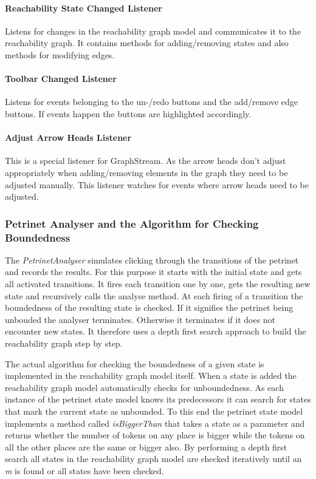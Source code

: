 \documentclass[10pt, a4paper]{article}
\begin{document}
\paragraph{Reachability State Changed Listener} Listens for changes in the reachability graph model and communicates it to the reachability graph. It contains methods for adding/removing states and also methods for modifying edges.
\paragraph{Toolbar Changed Listener} Listens for events belonging to the un-/redo buttons and the add/remove edge buttons. If events happen the buttons are highlighted accordingly.
\paragraph{Adjust Arrow Heads Listener} This is a special listener for GraphStream. As the arrow heads don't adjust appropriately when adding/removing elements in the graph they need to be adjusted manually. This listener watches for events where arrow heads need to be adjusted.

\subsubsection{Petrinet Analyser and the Algorithm for Checking Boundedness}
\label{label:algorithm}

The \textit{PetrinetAnalyser} simulates clicking through the transitions of the petrinet and records the results. For this purpose it starts with the initial state and gets all activated transitions. It fires each transition one by one, gets the resulting new state and recursively calls the analyse method. At each firing of a transition the boundedness of the resulting state is checked. If it signifies the petrinet being unbouded the analyser terminates. Otherwise it terminates if it does not encounter new states. It therefore uses a depth first search approach to build the reachability graph step by step.

The actual algorithm for checking the boundedness of a given state is implemented in the reachability graph model itself. When a state is added the reachability graph model automatically checks for unboundedness. As each instance of the petrinet state model knows its predecessors it can search for states that mark the current state as unbounded. To this end the petrinet state model implements a method called \textit{isBiggerThan} that takes a state as a parameter and returns whether the number of tokens on any place is bigger while the tokens on all the other places are the same or bigger also. By performing a depth first search all states in the reachability graph model are checked iteratively until an \textit{m} is found or all states have been checked.
\end{document}
